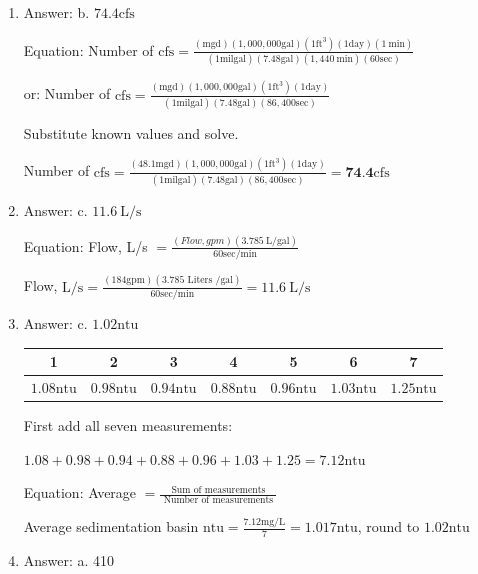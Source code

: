 \documentclass[10pt]{article}
\begin{document}
\begin{enumerate}
  \item Answer: b. $74.4 \mathrm{cfs}$

Equation: Number of $\mathrm{cfs}=\frac{(\mathrm{mgd})(1,000,000 \mathrm{gal})\left(1 \mathrm{ft}^{3}\right)(1 \mathrm{day})(1 \mathrm{~min})}{(1 \mathrm{mil} \mathrm{gal})(7.48 \mathrm{gal})(1,440 \mathrm{~min})(60 \mathrm{sec})}$

or: Number of $\mathrm{cfs}=\frac{(\mathrm{mgd})(1,000,000 \mathrm{gal})\left(1 \mathrm{ft}^{3}\right)(1 \mathrm{day})}{(1 \mathrm{mil} \mathrm{gal})(7.48 \mathrm{gal})(86,400 \mathrm{sec})}$

Substitute known values and solve.

Number of $\mathrm{cfs}=\frac{(48.1 \mathrm{mgd})(1,000,000 \mathrm{gal})\left(1 \mathrm{ft}^{3}\right)(1 \mathrm{day})}{(1 \mathrm{mil} \mathrm{gal})(7.48 \mathrm{gal})(86,400 \mathrm{sec})}=\mathbf{7 4 . 4} \mathrm{cfs}$

  \item Answer: c. $11.6 \mathrm{~L} / \mathrm{s}$

Equation: Flow, L/s $=\frac{(F l o w, g p m)(3.785 \mathrm{~L} / \mathrm{gal})}{60 \mathrm{sec} / \mathrm{min}}$

Flow, $\mathrm{L} / \mathrm{s}=\frac{(184 \mathrm{gpm})(3.785 \text { Liters } / \mathrm{gal})}{60 \mathrm{sec} / \mathrm{min}}=11.6 \mathrm{~L} / \mathrm{s}$

  \item Answer: c. $1.02 \mathrm{ntu}$

\begin{tabular}{|c|c|c|c|c|c|c|}
\hline
1 & 2 & 3 & 4 & 5 & 6 & 7 \\
\hline
$1.08 \mathrm{ntu}$ & $0.98 \mathrm{ntu}$ & $0.94 \mathrm{ntu}$ & $0.88 \mathrm{ntu}$ & $0.96 \mathrm{ntu}$ & $1.03 \mathrm{ntu}$ & $1.25 \mathrm{ntu}$ \\
\hline
\end{tabular}

First add all seven measurements:

$1.08+0.98+0.94+0.88+0.96+1.03+1.25=7.12 \mathrm{ntu}$

Equation: Average $=\frac{\text { Sum of measurements }}{\text { Number of measurements }}$

Average sedimentation basin $\mathrm{ntu}=\frac{7.12 \mathrm{mg} / \mathrm{L}}{7}=1.017 \mathrm{ntu}$, round to $1.02 \mathrm{ntu}$

  \item Answer: a. 410


\end{enumerate}
\end{document}
